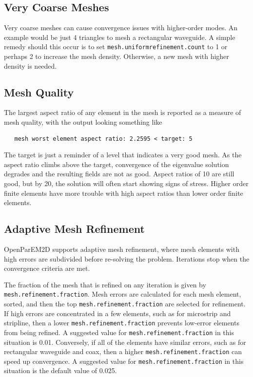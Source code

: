 \documentclass[titlepage]{article}
\renewcommand\_{\textunderscore\linebreak[1]}
\begin{document}
\subsection{Very Coarse Meshes}

Very coarse meshes can cause convergence issues with higher-order modes.  An example would be just 4 triangles to mesh a rectangular waveguide.  A simple remedy should this occur is to set \texttt{mesh.uniform\_refinement.count} to 1 or perhaps 2 to increase the mesh density. Otherwise, a new mesh with higher density is needed.

\subsection{Mesh Quality}

The largest aspect ratio of any element in the mesh is reported as a measure of mesh quality, with the output looking something like
\begin{verbatim}
   mesh worst element aspect ratio: 2.2595 < target: 5
\end{verbatim}
The target is just a reminder of a level that indicates a very good mesh.  As the aspect ratio climbs above the target, convergence of the eigenvalue solution degrades and the resulting fields are not as good.  Aspect ratios of 10 are still good, but by 20, the solution will often start showing signs of stress.  Higher order finite elements have more trouble with high aspect ratios than lower order finite elements.

\subsection{Adaptive Mesh Refinement}

OpenParEM2D supports adaptive mesh refinement, where mesh elements with high errors are subdivided before re-solving the problem.  Iterations stop when the convergence criteria are met.

The fraction of the mesh that is refined on any iteration is given by \texttt{mesh.refinement.fraction}.  Mesh errors are calculated for each mesh element, sorted, and then the top \texttt{mesh.refinement.fraction} are selected for refinement.  If high errors are concentrated in a few elements, such as for microstrip and stripline, then a lower \texttt{mesh.refinement.fraction} prevents low-error elements from being refined.  A suggested value for \texttt{mesh.refinement.fraction} in this situation is 0.01.  Conversely, if all of the elements have similar errors, such as for rectangular waveguide and coax, then a higher \texttt{mesh.refinement.fraction} can speed up convergence. A suggested value for \texttt{mesh.refinement.fraction} in this situation is the default value of 0.025. 
\end{document}
